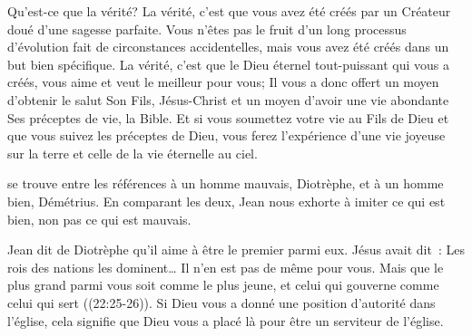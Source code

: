 Qu'est-ce que la vérité? La vérité, c'est que vous avez été créés
 par un Créateur doué d'une sagesse parfaite.
 Vous n'êtes pas le fruit d'un long processus d'évolution
 fait de circonstances accidentelles, mais vous avez été créés
 dans un but bien spécifique. La vérité, c'est que le Dieu éternel
 tout-puissant qui vous a créés, vous aime et veut le meilleur pour vous;
 Il vous a donc offert un moyen d'obtenir le salut
 \ocadr Son Fils, Jésus-Christ \fcadr{} et un moyen d'avoir une vie abondante
 \ocadr Ses préceptes de vie, la Bible.
 Et si vous soumettez votre vie au Fils de Dieu et que vous suivez
 les préceptes de Dieu, vous ferez l'expérience d'une vie joyeuse
 sur la terre et celle de la vie éternelle au ciel. 

\dvrule







 se trouve entre les références
 à un homme mauvais, Diotrèphe, et à un homme bien, 
 Démétrius.
 En comparant les deux, Jean nous exhorte à imiter ce qui est bien, 
 non pas ce qui est mauvais. 

Jean dit de Diotrèphe qu'il \og aime à être le premier parmi eux. \fg{}
 Jésus avait dit~: 
 \fg{} Les rois des nations les dominent\dots{}
 Il n'en est pas de même pour vous. Mais que le plus grand parmi vous
 soit comme le plus jeune, et celui qui gouverne comme celui qui sert \fg{}
 ((22:25-26)).
 Si Dieu vous a donné une position d'autorité dans l'église,
 cela signifie que Dieu vous a placé là pour être un serviteur de l'église.


